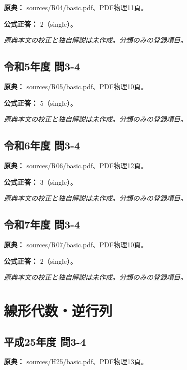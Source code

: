 \noindent\textbf{原典：} sources/R04/basic.pdf、PDF物理11頁。

\textbf{公式正答：} 2（single）。

\par\textit{原典本文の校正と独自解説は未作成。分類のみの登録項目。}

\subsection{令和5年度 問3-4}
\label{q:r05-reg-basic-3-4}

\noindent\textbf{原典：} sources/R05/basic.pdf、PDF物理10頁。

\textbf{公式正答：} 5（single）。

\par\textit{原典本文の校正と独自解説は未作成。分類のみの登録項目。}

\subsection{令和6年度 問3-4}
\label{q:r06-reg-basic-3-4}

\noindent\textbf{原典：} sources/R06/basic.pdf、PDF物理12頁。

\textbf{公式正答：} 3（single）。

\par\textit{原典本文の校正と独自解説は未作成。分類のみの登録項目。}

\subsection{令和7年度 問3-4}
\label{q:r07-reg-basic-3-4}

\noindent\textbf{原典：} sources/R07/basic.pdf、PDF物理10頁。

\textbf{公式正答：} 2（single）。

\par\textit{原典本文の校正と独自解説は未作成。分類のみの登録項目。}

\section{線形代数・逆行列}

\subsection{平成25年度 問3-4}
\label{q:h25-reg-basic-3-4}

\noindent\textbf{原典：} sources/H25/basic.pdf、PDF物理13頁。

